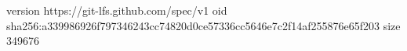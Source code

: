 version https://git-lfs.github.com/spec/v1
oid sha256:a339986926f797346243cc74820d0ce57336cc5646e7c2f14af255876e65f203
size 349676
